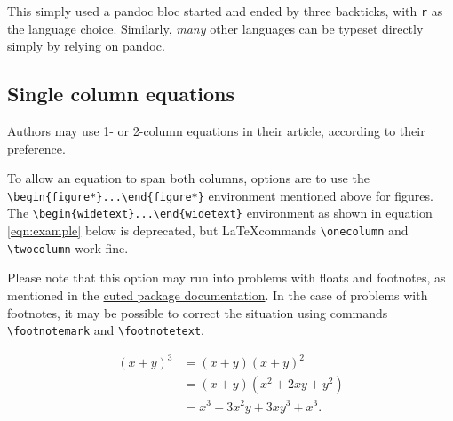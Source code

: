 \documentclass[letterpaper,10pt,twocolumn,twoside,]{pinp}
\begin{document}
\begin{Shaded}
\begin{Highlighting}[]
\OtherTok{\textless{}{-}}\NormalTok{ faithful[,}\NormalTok{]}
\OtherTok{\textless{}{-}} 
\end{Highlighting}
\end{Shaded}

This simply used a pandoc bloc started and ended by three backticks,
with \texttt{r} as the language choice. Similarly, \emph{many} other
languages can be typeset directly simply by relying on pandoc.

\hypertarget{single-column-equations}{%
\subsection{Single column equations}\label{single-column-equations}}

Authors may use 1- or 2-column equations in their article, according to
their preference.

To allow an equation to span both columns, options are to use the
\texttt{\textbackslash{}begin\{figure*\}...\textbackslash{}end\{figure*\}}
environment mentioned above for figures. The
\texttt{\textbackslash{}begin\{widetext\}...\textbackslash{}end\{widetext\}}
environment as shown in equation \ref{eqn:example} below is deprecated,
but \LaTeX commands \texttt{\textbackslash{}onecolumn} and
\texttt{\textbackslash{}twocolumn} work fine.

Please note that this option may run into problems with floats and
footnotes, as mentioned in the \href{http://texdoc.net/pkg/cuted}{cuted
package documentation}. In the case of problems with footnotes, it may
be possible to correct the situation using commands
\texttt{\textbackslash{}footnotemark} and
\texttt{\textbackslash{}footnotetext}.

\begin{equation}
  \begin{aligned}
(x+y)^3&=(x+y)(x+y)^2\\
       &=(x+y)(x^2+2xy+y^2) \\
       &=x^3+3x^2y+3xy^3+x^3. 
       \label{eqn:example} 
  \end{aligned}
\end{equation}

\showacknow




\end{document}
